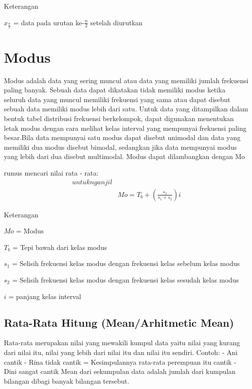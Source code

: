 \documentclass[11pt,fleqn]{book} %
\begin{document}
{Keterangan 

$x_{\frac{n}{2}}$ = data pada urutan ke-$\frac{n}{2}$ setelah diurutkan


\section{Modus}

Modus adalah data yang sering muncul atau data yang memiliki jumlah frekuensi paling banyak. Sebuah data dapat dikatakan tidak memiliki modus ketika seluruh data yang muncul memiliki frekuensi yang sama atau dapat disebut sebuah data memiliki modus lebih dari satu.
Untuk data yang ditampilkan dalam bentuk tabel distribusi frekuensi berkelompok, dapat digunakan menentukan letak modus dengan cara melihat kelas interval yang mempunyai frekuensi paling besar.Bila data mempunyai satu modus dapat disebut unimodal dan data yang memiliki dua modus disebut bimodal, sedangkan jika data mempunyai modus yang lebih dari dua disebut multimodal. Modus dapat dilambangkan dengan Mo

\begin{theorem}[Mean]
rumus mencari nilai rata - rata:
\begin{align}
untuk n ganjil\\
& Mo = T_{b}+(\frac{s_{1}}{s_{1}+s_{2}})i
\end{align}
\end{theorem}

Keterangan 

$Mo$ = Modus

$T_{b}$ = Tepi bawah dari kelas modus

$s_{1}$ = Selisih frekuensi kelas modus dengan frekuensi kelas sebelum kelas modus

$s_{2}$ = Selisih frekuensi kelas modus dengan frekuensi kelas sesudah kelas modus

$i$ = panjang kelas interval

\subsection{Rata-Rata Hitung (Mean/Arhitmetic Mean)}

Rata-rata merupakan nilai yang mewakili kumpul data yaitu nilai yang kurang dari nilai itu, nilai yang lebih dari nilai itu dan nilai itu sendiri. 
Contoh:
-	Ani cantik
-	Rina tidak cantik		=      Kesimpulannya rata-rata perempuan itu cantik
-	Dini  sangat cantik          
Mean dari sekumpulan data adalah jumlah dari kumpulan bilangan dibagi banyak bilangan tersebut. 

}
\end{document}
